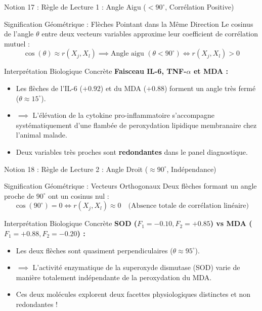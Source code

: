 \documentclass[aspectratio=169,10pt]{beamer}
\begin{document}
\begin{frame}{Notion 17 : Règle de Lecture 1 : Angle Aigu ($< 90^\circ$, Corrélation Positive)}
  \begin{conceptbox}{Signification Géométrique : Flèches Pointant dans la Même Direction}
    \footnotesize
    Le cosinus de l'angle $\theta$ entre deux vecteurs variables approxime leur coefficient de corrélation mutuel :
    \begin{equation*}
      \cos(\theta) \approx r(X_j, X_l) \implies \text{Angle aigu } (\theta < 90^\circ) \iff r(X_j, X_l) > 0
    \end{equation*}
  \end{conceptbox}
  \vspace{1mm}
  \begin{biobox}{Interprétation Biologique Concrète}
    \footnotesize
    \textbf{Faisceau IL-6, TNF-$\alpha$ et MDA :}
    \begin{itemize}
      \item Les flèches de l'IL-6 ($+0.92$) et du MDA ($+0.88$) forment un angle très fermé ($\theta \approx 15^\circ$).
      \item $\implies$ L'élévation de la cytokine pro-inflammatoire s'accompagne systématiquement d'une flambée de peroxydation lipidique membranaire chez l'animal malade.
      \item Deux variables très proches sont \textbf{redondantes} dans le panel diagnostique.
    \end{itemize}
  \end{biobox}
\end{frame}

\begin{frame}{Notion 18 : Règle de Lecture 2 : Angle Droit ($\approx 90^\circ$, Indépendance)}
  \begin{conceptbox}{Signification Géométrique : Vecteurs Orthogonaux}
    \footnotesize
    Deux flèches formant un angle proche de $90^\circ$ ont un cosinus nul :
    \begin{equation*}
      \cos(90^\circ) = 0 \iff r(X_j, X_l) \approx 0 \quad \text{(Absence totale de corrélation linéaire)}
    \end{equation*}
  \end{conceptbox}
  \vspace{1mm}
  \begin{biobox}{Interprétation Biologique Concrète}
    \footnotesize
    \textbf{SOD ($F_1 = -0.10, F_2 = +0.85$) vs MDA ($F_1 = +0.88, F_2 = -0.20$) :}
    \begin{itemize}
      \item Les deux flèches sont quasiment perpendiculaires ($\theta \approx 95^\circ$).
      \item $\implies$ L'activité enzymatique de la superoxyde dismutase (SOD) varie de manière totalement indépendante de la peroxydation du MDA.
      \item Ces deux molécules explorent deux facettes physiologiques distinctes et non redondantes !
    \end{itemize}
  \end{biobox}
\end{frame}
\end{document}
